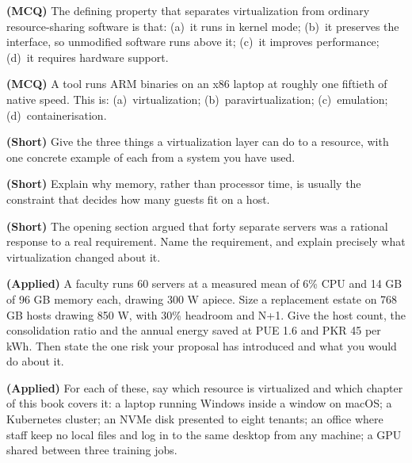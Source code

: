 \begin{reviewq}
  \item \textbf{(MCQ)} The defining property that separates virtualization from
        ordinary resource-sharing software is that: (a)~it runs in kernel mode;
        (b)~it preserves the interface, so unmodified software runs above it;
        (c)~it improves performance; (d)~it requires hardware support.
  \item \textbf{(MCQ)} A tool runs ARM binaries on an x86 laptop at roughly one
        fiftieth of native speed. This is: (a)~virtualization;
        (b)~paravirtualization; (c)~emulation; (d)~containerisation.
  \item \textbf{(Short)} Give the three things a virtualization layer can do to
        a resource, with one concrete example of each from a system you have
        used.
  \item \textbf{(Short)} Explain why memory, rather than processor time, is
        usually the constraint that decides how many guests fit on a host.
  \item \textbf{(Short)} The opening section argued that forty separate servers
        was a rational response to a real requirement. Name the requirement,
        and explain precisely what virtualization changed about it.
  \item \textbf{(Applied)} A faculty runs 60 servers at a measured mean of 6\%
        CPU and 14 GB of 96 GB memory each, drawing 300 W apiece. Size a
        replacement estate on 768 GB hosts drawing 850 W, with 30\% headroom and
        N+1. Give the host count, the consolidation ratio and the annual energy
        saved at PUE 1.6 and PKR 45 per kWh. Then state the one risk your
        proposal has introduced and what you would do about it.
  \item \textbf{(Applied)} For each of these, say which resource is virtualized
        and which chapter of this book covers it: a laptop running Windows
        inside a window on macOS; a Kubernetes cluster; an NVMe disk presented
        to eight tenants; an office where staff keep no local files and log in
        to the same desktop from any machine; a GPU shared between three
        training jobs.
\end{reviewq}
